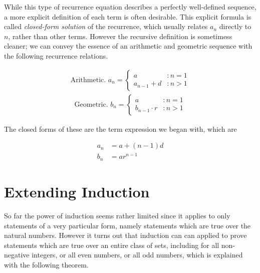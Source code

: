 \documentclass[twoside]{report}
\begin{document}
While this type of recurrence equation describes a perfectly well-defined sequence, a more explicit definition of each term is often desirable. This explicit formula is called \emph{closed-form solution} of the recurrence, which usually relates $a_n$ directly to $n$, rather than other terms. However the recursive definition is sometimess cleaner; we can convey the essence of an arithmetic and geometric sequence with the following recurrence relations.

\begin{align*}
	\text{Arithmetic. } a_n = \begin{cases}
		a &: n = 1 \\
		a_{n - 1} + d &: n > 1
	\end{cases} 
\end{align*}
\begin{align*}
	\text{Geometric. } b_n = \begin{cases}
 		a &: n = 1 \\
 		b_{n - 1} \cdot r &: n > 1
	\end{cases}
\end{align*}

The closed forms of these are the term expression we began with, which are

\begin{align*}
	a_n &= a + (n - 1)d \\
	b_n &= a r^{n - 1}
\end{align*}

\section{Extending Induction}

So far the power of induction seems rather limited since it applies to only statements of a very particular form, namely statements which are true over the natural numbers. However it turns out that induction can can applied to prove statements which are true over an entire class of sets, including for all non-negative integers, or all even numbers, or all odd numbers, which is explained with the following theorem.
\end{document}
